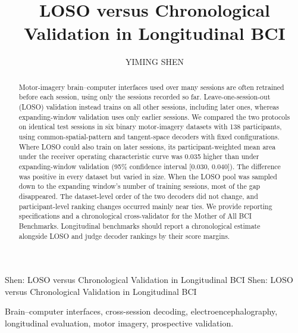 \documentclass{ieeeaccess}
\begin{document}
\history{}
\doi{}

\title{LOSO versus Chronological Validation in Longitudinal BCI}

\author{\uppercase{Yiming Shen}}
\address[1]{Department of Mathematics, University of Massachusetts Boston,
Boston, MA 02125 USA (e-mail: yiming.shen001@umb.edu)}
\markboth
{Shen: LOSO versus Chronological Validation in Longitudinal BCI}
{Shen: LOSO versus Chronological Validation in Longitudinal BCI}

\begin{abstract}
Motor-imagery brain--computer interfaces used over many sessions are often
retrained before each session, using only the sessions recorded so far.
Leave-one-session-out (LOSO) validation instead trains on all other sessions,
including later ones, whereas expanding-window validation uses only earlier
sessions. We compared the two protocols on identical test sessions in six binary
motor-imagery datasets with 138 participants, using common-spatial-pattern and
tangent-space decoders with fixed configurations. Where LOSO could also train on
later sessions, its participant-weighted mean area under the receiver operating
characteristic curve was 0.035 higher than under expanding-window validation
(95\% confidence interval [0.030, 0.040]). The difference was positive in every
dataset but varied in size. When the LOSO pool was sampled down to the
expanding window's number of training sessions, most of the gap disappeared.
The dataset-level order of the two decoders did not change, and
participant-level ranking changes occurred mainly near ties. We provide
reporting specifications and a chronological cross-validator for the Mother of
All BCI Benchmarks. Longitudinal benchmarks should report a chronological
estimate alongside LOSO and judge decoder rankings by their score margins.
\end{abstract}

\begin{keywords}
Brain--computer interfaces, cross-session decoding, electroencephalography,
longitudinal evaluation, motor imagery, prospective validation.
\end{keywords}

\titlepgskip=-21pt
\maketitle
\raggedbottom
\end{document}
